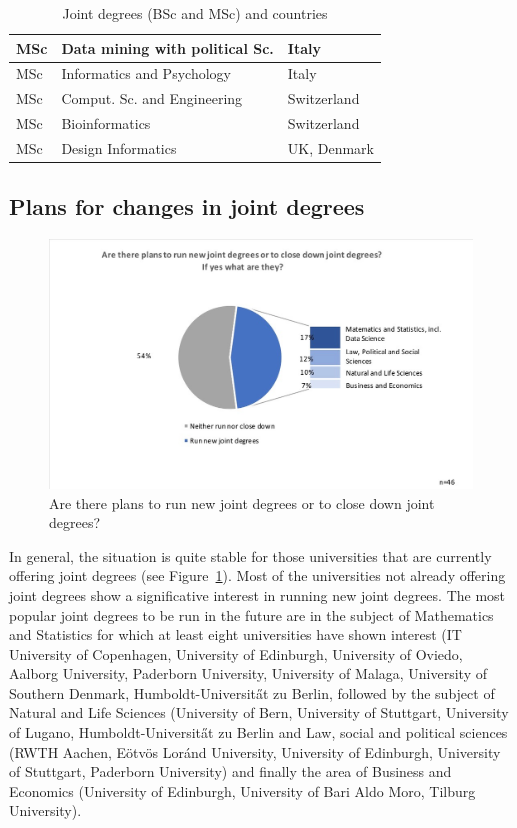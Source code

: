 \begin{table}
\begin{center}
\begin{tabular}  {|l|l|l|}
\hline
MSc & Data mining with political Sc.  &  Italy\\
\hline
MSc&  Informatics and Psychology   &  Italy\\
\hline
MSc & Comput. Sc. and Engineering & Switzerland\\
\hline
MSc& Bioinformatics  & Switzerland\\
\hline
MSc & Design Informatics    & UK, Denmark\\
\hline
\end{tabular}
\vspace*{.4cm}
\caption{Joint degrees (BSc and MSc) and countries}
\end{center}
\label{ sect3:titles}
\end{table}


\subsection{Plans for changes in joint degrees} 

\begin{figure}[h]
\includegraphics[width = \linewidth]{charts/2b.jpg}
\caption{Are there plans to run new joint degrees or to close down joint degrees?}
\label{sect3:change}
\end{figure}

In general, the situation is  quite stable for those universities that are currently offering joint degrees (see Figure~\ref{sect3:change}). Most of the universities not already offering joint degrees show a significative interest in running new joint degrees. The most popular joint degrees to be run in the future are in the subject of Mathematics and Statistics for which at least eight universities have shown interest (IT University of Copenhagen, University of Edinburgh, University of Oviedo, Aalborg University, Paderborn University, University of Malaga, University of Southern Denmark, Humboldt-Universit\H at zu Berlin, followed by the subject of 
Natural and Life Sciences (University of Bern, University of Stuttgart, University of Lugano, Humboldt-Universit\H at zu Berlin and 
Law, social and political sciences (RWTH Aachen, E\" otv\"os Lor\'and University, University of Edinburgh, University of Stuttgart, Paderborn University) and finally the area of  Business and Economics (University of Edinburgh, University of Bari Aldo Moro, Tilburg University). 

